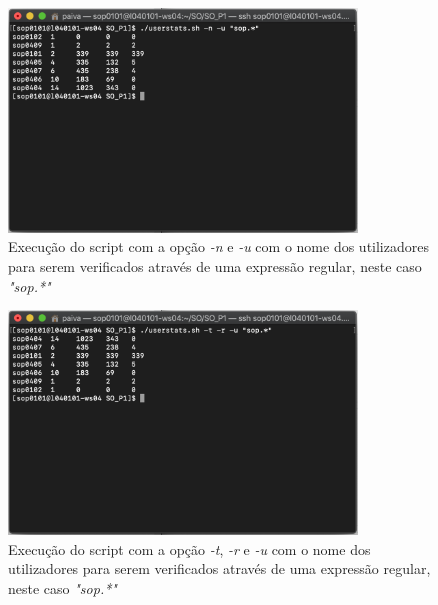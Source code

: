 \documentclass[10pt,portuguese]{article}
\begin{document}
\begin{figure}[!h]
    \centering
    \includegraphics[width=350]{Resultados/-n_-u.png}
    \caption{Execução do script com a opção \textit{-n} e \textit{-u} com o nome dos utilizadores para serem verificados através de uma expressão regular, neste caso \textit{"sop.*"}}
\end{figure}

\begin{figure}[!h]
    \centering
    \includegraphics[width=350]{Resultados/-t_-r_-u.png}
    \caption{Execução do script com a opção \textit{-t}, \textit{-r} e \textit{-u} com o nome dos utilizadores para serem verificados através de uma expressão regular, neste caso \textit{"sop.*"}}
\end{figure}
\end{document}
